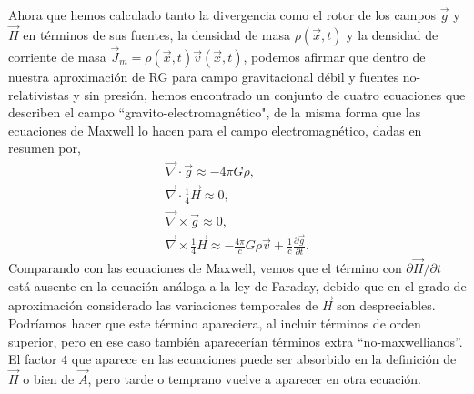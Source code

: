 Ahora que hemos calculado tanto la divergencia como el rotor de los campos $\vec{g}$ y $\vec{H}$ en términos de sus fuentes, la densidad de masa $\rho (\vec{x},t)$ y la densidad de corriente de masa $\vec{J}_m=\rho (\vec{x},t)\vec{v}(\vec{x},t)$, podemos afirmar que dentro de nuestra aproximación de RG para campo gravitacional débil y fuentes no-relativistas y sin presión, hemos encontrado un conjunto de cuatro ecuaciones que describen el campo ``gravito-electromagnético", de la misma forma que las ecuaciones de Maxwell lo hacen para el campo electromagnético, dadas en resumen por,
\begin{gather}
\vec{\nabla}\cdot\vec{g}\approx -4\pi G\rho ,\\
\vec{\nabla}\cdot\frac{1}{4}\vec{H}\approx 0,\\
\vec{\nabla}\times\vec{g}\approx 0,\\
\vec{\nabla}\times\frac{1}{4}\vec{H}\approx -\frac{4\pi}{c}G\rho \vec{v}+\frac{1}{c}\frac{\partial \vec{g}}{\partial t}.
\end{gather}
Comparando con las ecuaciones de Maxwell, vemos que el término con $\partial \vec{H}/\partial t$ está ausente en la ecuación análoga a la ley de Faraday, debido que en el grado de aproximación considerado las variaciones temporales de $\vec{H}$ son despreciables. Podríamos hacer que este término apareciera, al incluir términos de orden superior, pero en ese caso también aparecerían términos extra ``no-maxwellianos''. El factor $4$ que aparece en las ecuaciones puede ser absorbido en la definición de $\vec{H}$ o bien de $\vec{A}$, pero tarde o temprano vuelve a aparecer en otra ecuación.


